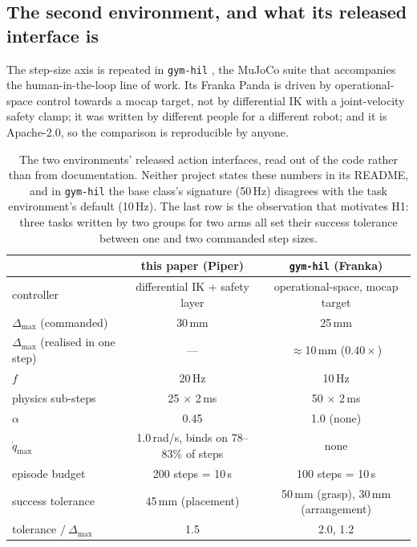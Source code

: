 \documentclass{article}
\newcommand{\dmax}{\Delta_{\max}}
\newcommand{\qdmax}{\dot q_{\max}}
\begin{document}
\subsection{The second environment, and what its released interface is}
\label{sec:twoenvs}

The step-size axis is repeated in \texttt{gym-hil} \citep{gymhil2025}, the
MuJoCo suite that accompanies the human-in-the-loop line of work. Its Franka
Panda is driven by operational-space control towards a mocap target, not by
differential IK with a joint-velocity safety clamp; it was written by different
people for a different robot; and it is Apache-2.0, so the comparison is
reproducible by anyone.

\begin{table}[t]
\centering\small
\caption{The two environments' released action interfaces, read out of the code
rather than from documentation. Neither project states these numbers in its
README, and in \texttt{gym-hil} the base class's signature (50\,Hz) disagrees
with the task environment's default (10\,Hz). The last row is the observation
that motivates H1: three tasks written by two groups for two arms all set their
success tolerance between one and two commanded step sizes.}
\label{tab:twoenvs}
\begin{tabular}{@{}lcc@{}}
\toprule
 & this paper (Piper) & \texttt{gym-hil} (Franka) \\
\midrule
controller & differential IK + safety layer & operational-space, mocap target \\
$\dmax$ (commanded) & 30\,mm & 25\,mm \\
$\dmax$ (realised in one step) & --- & $\approx$10\,mm ($0.40\times$) \\
$f$ & 20\,Hz & 10\,Hz \\
physics sub-steps & 25 $\times$ 2\,ms & 50 $\times$ 2\,ms \\
$\alpha$ & 0.45 & 1.0 (none) \\
$\qdmax$ & 1.0\,rad/s, binds on 78--83\% of steps & none \\
episode budget & 200 steps = 10\,s & 100 steps = 10\,s \\
success tolerance & 45\,mm (placement) & 50\,mm (grasp), 30\,mm (arrangement) \\
\midrule
tolerance $/\ \dmax$ & 1.5 & 2.0, 1.2 \\
\bottomrule
\end{tabular}
\end{table}
\end{document}
